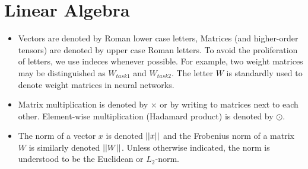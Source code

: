 \documentclass[14pt,a4paper]{article}
\begin{document}
\section{Linear Algebra}
\begin{itemize}
\item Vectors are denoted by Roman lower case letters, Matrices (and higher-order tensors) are denoted by
upper case Roman letters. To avoid the proliferation of letters, we use indeces whenever possible. For example,
two weight matrices may be distinguished as $ W_{task1} $ and $ W_{task2} $. The letter $ W $ is standardly
used to denote weight matrices in neural networks.
\item Matrix multiplication is denoted by $ \times $ or by writing
to matrices next to each other. Element-wise multiplication (Hadamard product) is denoted by $ \odot $.
\item The norm of a vector $ x $ is denoted $ \lvert \lvert x \rvert \rvert $ and the Frobenius norm of a matrix $ W $ is similarly denoted $ \lvert \lvert W \rvert \rvert $. Unless otherwise indicated, the norm is understood to be the Euclidean or $ L_{2} $-norm.
\end{itemize}
\end{document}
